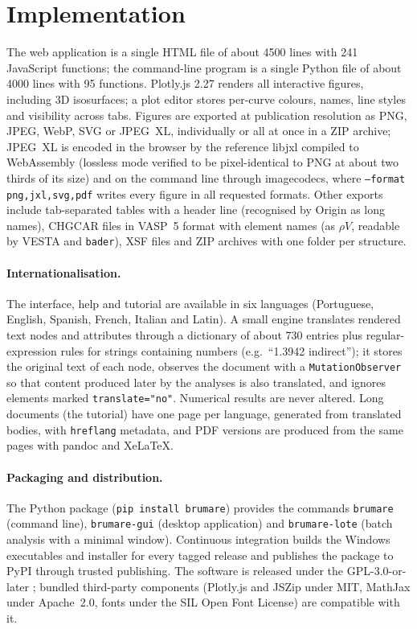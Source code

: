 \documentclass[11pt,a4paper]{article}
\newcommand{\code}[1]{\texttt{#1}}
\begin{document}
\section{Implementation}\label{sec:impl}
The web application is a single HTML file of about 4500 lines with 241 JavaScript functions; the command-line program is a single Python file of about 4000 lines with 95 functions. Plotly.js 2.27 renders all interactive figures, including 3D isosurfaces; a plot editor stores per-curve colours, names, line styles and visibility across tabs. Figures are exported at publication resolution as PNG, JPEG, WebP, SVG or JPEG~XL, individually or all at once in a ZIP archive; JPEG~XL is encoded in the browser by the reference libjxl compiled to WebAssembly (lossless mode verified to be pixel-identical to PNG at about two thirds of its size) and on the command line through imagecodecs, where \code{--format png,jxl,svg,pdf} writes every figure in all requested formats. Other exports include tab-separated tables with a header line (recognised by Origin as long names), CHGCAR files in VASP~5 format with element names (as $\rho V$, readable by VESTA and \code{bader}), XSF files and ZIP archives with one folder per structure.

\paragraph{Internationalisation.} The interface, help and tutorial are available in six languages (Portuguese, English, Spanish, French, Italian and Latin). A small engine translates rendered text nodes and attributes through a dictionary of about 730 entries plus regular-expression rules for strings containing numbers (e.g.\ ``1.3942 indirect''); it stores the original text of each node, observes the document with a \code{MutationObserver} so that content produced later by the analyses is also translated, and ignores elements marked \code{translate="no"}. Numerical results are never altered. Long documents (the tutorial) have one page per language, generated from translated bodies, with \code{hreflang} metadata, and PDF versions are produced from the same pages with pandoc and XeLaTeX.

\paragraph{Packaging and distribution.} The Python package (\code{pip install brumare}) provides the commands \code{brumare} (command line), \code{brumare-gui} (desktop application) and \code{brumare-lote} (batch analysis with a minimal window). Continuous integration builds the Windows executables and installer for every tagged release and publishes the package to PyPI through trusted publishing. The software is released under the GPL-3.0-or-later \cite{gplv3}; bundled third-party components (Plotly.js and JSZip under MIT, MathJax under Apache~2.0, fonts under the SIL Open Font License) are compatible with it.
\end{document}
